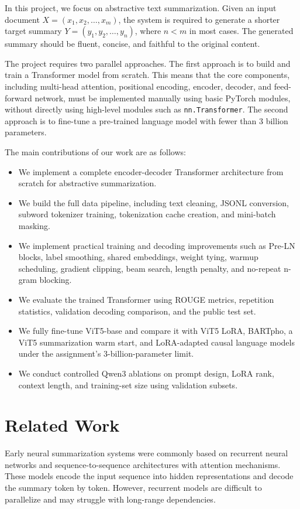 \documentclass[conference]{IEEEtran}
\begin{document}
In this project, we focus on abstractive text summarization. Given an input document $X = (x_1, x_2, \ldots, x_m)$, the system is required to generate a shorter target summary $Y = (y_1, y_2, \ldots, y_n)$, where $n < m$ in most cases. The generated summary should be fluent, concise, and faithful to the original content.

The project requires two parallel approaches. The first approach is to build and train a Transformer model from scratch. This means that the core components, including multi-head attention, positional encoding, encoder, decoder, and feed-forward network, must be implemented manually using basic PyTorch modules, without directly using high-level modules such as \texttt{nn.Transformer}. The second approach is to fine-tune a pre-trained language model with fewer than 3 billion parameters.

The main contributions of our work are as follows:
\begin{itemize}
    \item We implement a complete encoder-decoder Transformer architecture from scratch for abstractive summarization.
    \item We build the full data pipeline, including text cleaning, JSONL conversion, subword tokenizer training, tokenization cache creation, and mini-batch masking.
    \item We implement practical training and decoding improvements such as Pre-LN blocks, label smoothing, shared embeddings, weight tying, warmup scheduling, gradient clipping, beam search, length penalty, and no-repeat n-gram blocking.
    \item We evaluate the trained Transformer using ROUGE metrics, repetition statistics, validation decoding comparison, and the public test set.
    \item We fully fine-tune ViT5-base and compare it with ViT5 LoRA, BARTpho, a ViT5 summarization warm start, and LoRA-adapted causal language models under the assignment's 3-billion-parameter limit.
    \item We conduct controlled Qwen3 ablations on prompt design, LoRA rank, context length, and training-set size using validation subsets.
\end{itemize}

\section{Related Work}
Early neural summarization systems were commonly based on recurrent neural networks and sequence-to-sequence architectures with attention mechanisms. These models encode the input sequence into hidden representations and decode the summary token by token. However, recurrent models are difficult to parallelize and may struggle with long-range dependencies.
\end{document}
